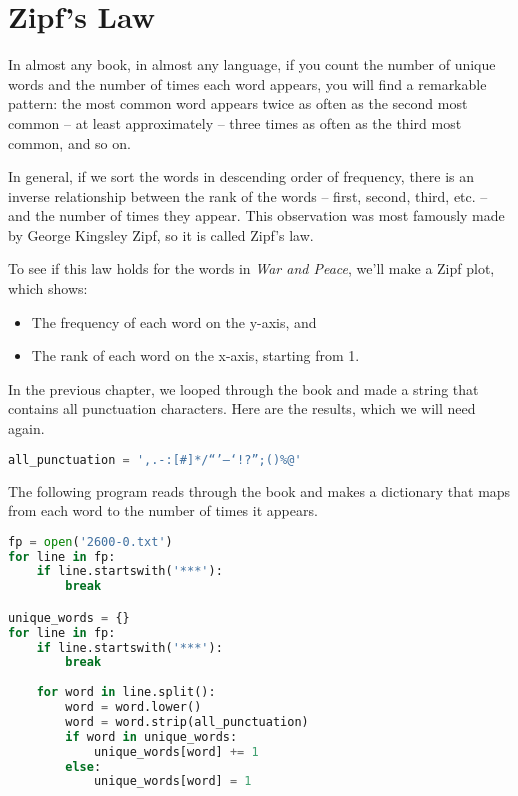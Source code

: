 \section{Zipf's Law}\label{zipfs-law}

In almost any book, in almost any language, if you count the number of
unique words and the number of times each word appears, you will find a
remarkable pattern: the most common word appears twice as often as the
second most common -- at least approximately -- three times as often as
the third most common, and so on.

In general, if we sort the words in descending order of frequency, there
is an inverse relationship between the rank of the words -- first,
second, third, etc. -- and the number of times they appear. This
observation was most famously made by George Kingsley Zipf, so it is
called Zipf's law.

To see if this law holds for the words in \emph{War and Peace}, we'll
make a Zipf plot, which shows:

\begin{itemize}
\item
  The frequency of each word on the y-axis, and
\item
  The rank of each word on the x-axis, starting from 1.
\end{itemize}

In the previous chapter, we looped through the book and made a string
that contains all punctuation characters. Here are the results, which we
will need again.

\begin{lstlisting}[language=Python,style=source]
all_punctuation = ',.-:[#]*/“’—‘!?”;()%@'
\end{lstlisting}

The following program reads through the book and makes a dictionary that
maps from each word to the number of times it appears.

\begin{lstlisting}[language=Python,style=source]
fp = open('2600-0.txt')
for line in fp:
    if line.startswith('***'):
        break

unique_words = {}
for line in fp:
    if line.startswith('***'):
        break
        
    for word in line.split():
        word = word.lower()
        word = word.strip(all_punctuation)
        if word in unique_words:
            unique_words[word] += 1
        else:
            unique_words[word] = 1
\end{lstlisting}

